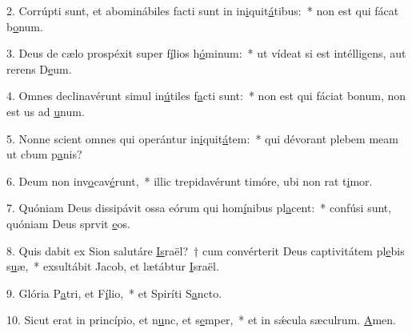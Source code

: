 2. Corrúpti sunt, et abominábiles facti sunt in in\uline{i}quit\uline{á}tibus:~* non est qui fácat b\uline{o}num.\par 
3. Deus de cælo prospéxit super f\uline{í}lios h\uline{ó}minum:~* ut vídeat si est intélligens, aut rerens D\uline{e}um.\par 
4. Omnes declinavérunt simul in\uline{ú}tiles f\uline{a}cti sunt:~* non est qui fáciat bonum, non est us ad \uline{u}num.\par 
5. Nonne scient omnes qui operántur in\uline{i}quit\uline{á}tem:~* qui dévorant plebem meam ut cbum p\uline{a}nis?\par 
6. Deum non inv\uline{o}cav\uline{é}runt,~* illic trepidavérunt timóre, ubi non rat t\uline{i}mor.\par 
7. Quóniam Deus dissipávit ossa eórum qui hom\uline{í}nibus pl\uline{a}cent:~* confúsi sunt, quóniam Deus sprvit \uline{e}os.\par 
8. Quis dabit ex Sion salutáre \uline{Is}raël?~† cum convérterit Deus captivitátem pl\uline{e}bis s\uline{u}æ,~* exsultábit Jacob, et lætábtur \uline{I}sraël.\par 
9. Glória P\uline{a}tri, et F\uline{í}lio,~* et Spiríti S\uline{a}ncto.\par 
10. Sicut erat in princípio, et n\uline{u}nc, et s\uline{e}mper,~* et in sǽcula sæculrum. \uline{A}men.\par 
